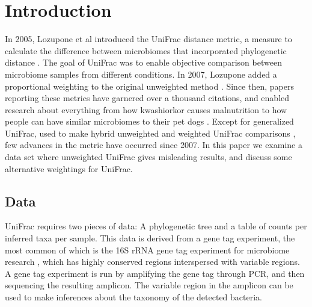 \documentclass[10pt,letterpaper]{article}
\begin{document}

\linenumbers

\section*{Introduction}
In 2005, Lozupone et al introduced the UniFrac distance metric, a measure to calculate the difference between microbiomes that incorporated phylogenetic distance \cite{lozupone2005unifrac}. The goal of UniFrac was to enable objective comparison between microbiome samples from different conditions. In 2007, Lozupone added a proportional weighting to the original unweighted method \cite{lozupone2007quantitative}. Since then, papers reporting these metrics have garnered over a thousand citations, and enabled research about everything from how kwashiorkor causes malnutrition \cite{smith2013gut} to how people can have similar microbiomes to their pet dogs \cite{song2013cohabiting}. Except for generalized UniFrac, used to make hybrid unweighted and weighted UniFrac comparisons \cite{chen2012associating}, few advances in the metric have occurred since 2007. In this paper we examine a data set where unweighted UniFrac gives misleading results, and discuss some alternative weightings for UniFrac.

\subsection{Data}
UniFrac requires two pieces of data: A phylogenetic tree and a table of counts per inferred taxa per sample. This data is derived from a gene tag experiment, the most common of which is the 16S rRNA gene tag experiment for microbiome research \cite{tringe2008renaissance}, which has highly conserved regions interspersed with variable regions. A gene tag experiment is run by amplifying the gene tag through PCR, and then sequencing the resulting amplicon. The variable region in the amplicon can be used to make inferences about the taxonomy of the detected bacteria.
\end{document}
